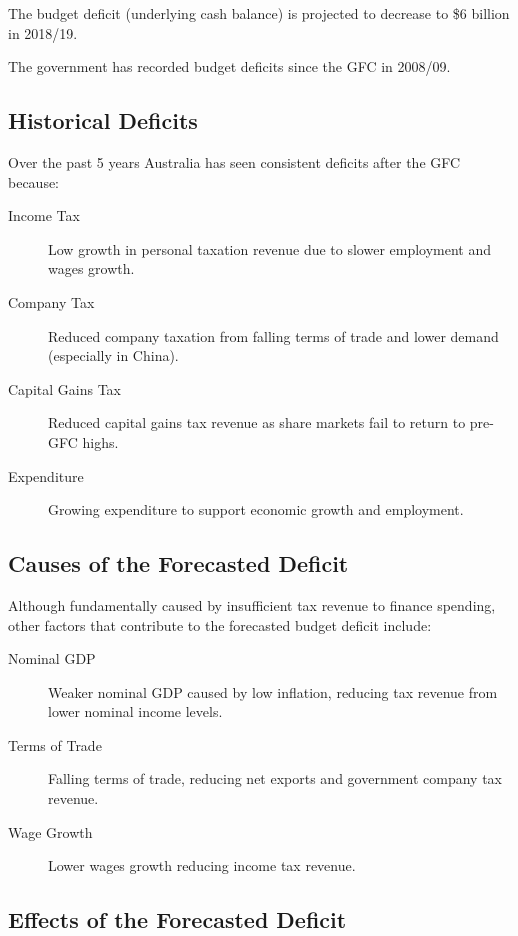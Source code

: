 \documentclass[a4paper,11pt]{article}
\begin{document}
The budget deficit (underlying cash balance) is projected to decrease to \$6
billion in 2018/19.

The government has recorded budget deficits since the GFC in 2008/09.


\subsection{Historical Deficits}

Over the past 5 years Australia has seen consistent deficits after the GFC
because:

\begin{description}
\item [Income Tax] Low growth in personal taxation revenue due to slower
	employment and wages growth.
\item [Company Tax] Reduced company taxation from falling terms of trade and
	lower demand (especially in China).
\item [Capital Gains Tax] Reduced capital gains tax revenue as share markets
	fail to return to pre-GFC highs.
\item [Expenditure] Growing expenditure to support economic growth and employment.
\end{description}


\subsection{Causes of the Forecasted Deficit}

Although fundamentally caused by insufficient tax revenue to finance spending,
other factors that contribute to the forecasted budget deficit include:

\begin{description}
\item [Nominal GDP] Weaker nominal GDP caused by low inflation, reducing tax
	revenue from lower nominal income levels.
\item [Terms of Trade] Falling terms of trade, reducing net exports and
	government company tax revenue.
\item [Wage Growth] Lower wages growth reducing income tax revenue.
\end{description}


\subsection{Effects of the Forecasted Deficit}
\end{document}
